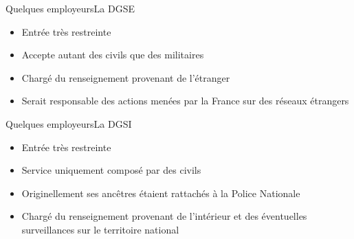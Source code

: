 \documentclass{beamer}
\begin{document}
{ 
\begin{frame}{Quelques employeurs}{La DGSE}

    \begin{itemize}
        \item Entrée très restreinte
        \item Accepte autant des civils que des militaires
        \item Chargé du renseignement provenant de l'étranger
        \item Serait responsable des actions menées par la France sur des réseaux étrangers
    \end{itemize}
    
\end{frame}
}

{ 
\begin{frame}{Quelques employeurs}{La DGSI}

    \begin{itemize}
        \item Entrée très restreinte
        \item Service uniquement composé par des civils
        \item Originellement ses ancêtres étaient rattachés à la Police Nationale
        \item Chargé du renseignement provenant de l'intérieur et des éventuelles surveillances sur le territoire national
    \end{itemize}
    
\end{frame}
}
\end{document}
